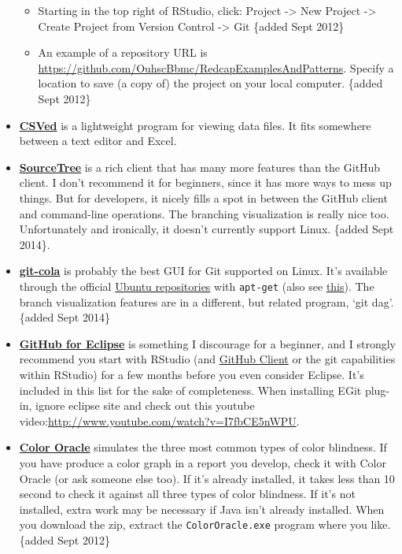 \documentclass[]{book}
\providecommand{\tightlist}{%
  \setlength{\itemsep}{0pt}\setlength{\parskip}{0pt}}
\begin{document}
\begin{itemize}
  \begin{itemize}
  \tightlist
  \item
    Starting in the top right of RStudio, click: Project -\textgreater{} New Project -\textgreater{} Create Project from Version Control -\textgreater{} Git \{added Sept 2012\}
  \item
    An example of a repository URL is \url{https://github.com/OuhscBbmc/RedcapExamplesAndPatterns}. Specify a location to save (a copy of) the project on your local computer. \{added Sept 2012\}
  \end{itemize}
\item
  \textbf{\href{http://csved.sjfrancke.nl/}{CSVed}} is a lightweight program for viewing data files. It fits somewhere between a text editor and Excel.
\item
  \textbf{\href{http://www.sourcetreeapp.com/}{SourceTree}} is a rich client that has many more features than the GitHub client. I don't recommend it for beginners, since it has more ways to mess up things. But for developers, it nicely fills a spot in between the GitHub client and command-line operations. The branching visualization is really nice too. Unfortunately and ironically, it doesn't currently support Linux. \{added Sept 2014\}.
\item
  \textbf{\href{http://git-cola.github.io/}{git-cola}} is probably the best GUI for Git supported on Linux. It's available through the official \href{http://packages.ubuntu.com/search?keywords=git-cola}{Ubuntu repositories} with \texttt{apt-get} (also see \href{https://apps.ubuntu.com/cat/applications/git-cola/}{this}). The branch visualization features are in a different, but related program, `git dag'. \{added Sept 2014\}
\item
  \textbf{\href{http://eclipse.github.com/}{GitHub for Eclipse}} is something I discourage for a beginner, and I strongly recommend you start with RStudio (and \href{http://windows.github.com/}{GitHub Client} or the git capabilities within RStudio) for a few months before you even consider Eclipse. It's included in this list for the sake of completeness. When installing EGit plug-in, ignore eclipse site and check out this youtube video:\url{http://www.youtube.com/watch?v=I7fbCE5nWPU}.
\item
  \textbf{\href{http://colororacle.org/}{Color Oracle}} simulates the three most common types of color blindness. If you have produce a color graph in a report you develop, check it with Color Oracle (or ask someone else too). If it's already installed, it takes less than 10 second to check it against all three types of color blindness. If it's not installed, extra work may be necessary if Java isn't already installed. When you download the zip, extract the \texttt{ColorOracle.exe} program where you like. \{added Sept 2012\}
\end{itemize}
\end{document}
